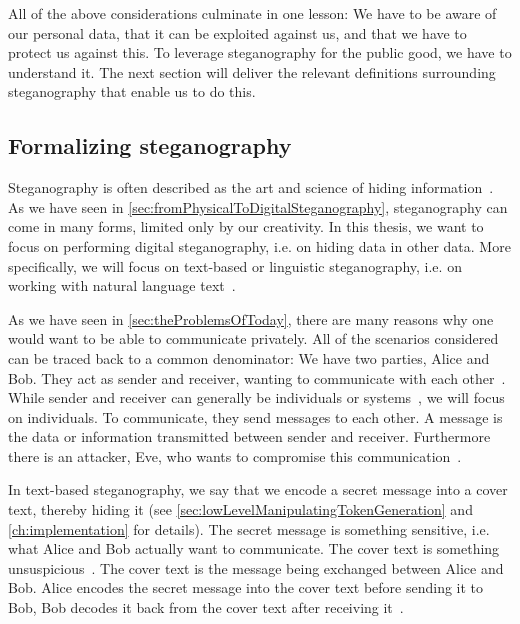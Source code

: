 All of the above considerations culminate in one lesson: We have to be aware of our personal data, that it can be exploited against us, and that we have to protect us against this. To leverage steganography for the public good, we have to understand it. The next section will deliver the relevant definitions surrounding steganography that enable us to do this.

\subsection{Formalizing steganography}
\label{sec:formalizingSteganography}
Steganography is often described as the art and science of hiding information~\cite{bennettLinguisticSteganographySurvey2004,wuGenerativeTextSteganography2024}. As we have seen in \cref{sec:fromPhysicalToDigitalSteganography}, steganography can come in many forms, limited only by our creativity. In this thesis, we want to focus on performing digital steganography, i.e. on hiding data in other data. More specifically, we will focus on text-based or linguistic steganography, i.e. on working with natural language text~\cite{zieglerNeuralLinguisticSteganography2019}.

As we have seen in \cref{sec:theProblemsOfToday}, there are many reasons why one would want to be able to communicate privately. All of the scenarios considered can be traced back to a common denominator: We have two parties, Alice and Bob. They act as sender and receiver, wanting to communicate with each other~\cite{wuGenerativeTextSteganography2024}. While sender and receiver can generally be individuals or systems~\cite{bennettLinguisticSteganographySurvey2004}, we will focus on individuals. To communicate, they send messages to each other. A message is the data or information transmitted between sender and receiver. Furthermore there is an attacker, Eve, who wants to compromise this communication~\cite{al-aniOverviewMainFundamentals2010,wuGenerativeTextSteganography2024}.

In text-based steganography, we say that we encode a secret message into a cover text, thereby hiding it (see \cref{sec:lowLevelManipulatingTokenGeneration} and \cref{ch:implementation} for details). The secret message is something sensitive, i.e. what Alice and Bob actually want to communicate. The cover text is something unsuspicious~\cite{al-aniOverviewMainFundamentals2010}. The cover text is the message being exchanged between Alice and Bob. Alice encodes the secret message into the cover text before sending it to Bob, Bob decodes it back from the cover text after receiving it~\cite{al-aniOverviewMainFundamentals2010}.

